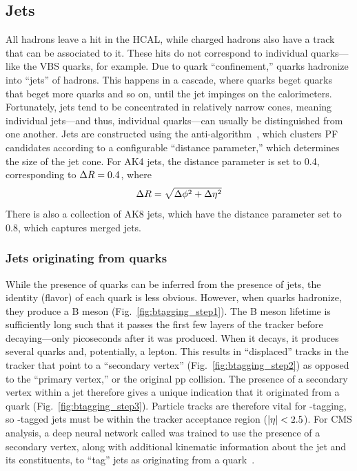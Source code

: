 \subsection{Jets}
All hadrons leave a hit in the HCAL, while charged hadrons also have a track that can be associated to it. 
These hits do not correspond to individual quarks---like the VBS quarks, for example. 
Due to quark ``confinement,'' quarks hadronize into ``jets'' of hadrons. 
This happens in a cascade, where quarks beget quarks that beget more quarks and so on, until the jet impinges on the calorimeters. 
Fortunately, jets tend to be concentrated in relatively narrow cones, meaning individual jets---and thus, individual quarks---can usually be distinguished from one another. 
Jets are constructed using the anti-\kt algorithm~\cite{Cacciari:2008gp, Cacciari:2011ma}, which clusters PF candidates according to a configurable ``distance parameter,'' which determines the size of the jet cone. %
For AK4 jets, the distance parameter is set to 0.4, corresponding to $\Delta R = 0.4$, where
\begin{equation}
    \Delta R = \sqrt{\Delta\phi^2 + \Delta\eta^2}
\end{equation}
There is also a collection of AK8 jets, which have the distance parameter set to 0.8, which captures merged jets.

\subsubsection{Jets originating from \Pb quarks}
While the presence of quarks can be inferred from the presence of jets, the identity (flavor) of each quark is less obvious. 
However, when \Pb quarks hadronize, they produce a B meson (Fig.~\ref{fig:btagging_step1}). 
The B meson lifetime is sufficiently long such that it passes the first few layers of the tracker before decaying---only picoseconds after it was produced. 
When it decays, it produces several quarks and, potentially, a lepton. 
This results in ``displaced'' tracks in the tracker that point to a ``secondary vertex'' (Fig.~\ref{fig:btagging_step2}) as opposed to the ``primary vertex,'' or the original pp collision. 
The presence of a secondary vertex within a jet therefore gives a unique indication that it originated from a \Pb quark (Fig.~\ref{fig:btagging_step3}). 
Particle tracks are therefore vital for \Pb-tagging, so \Pb-tagged jets must be within the tracker acceptance region ($\lvert \eta \rvert < 2.5$). 
For CMS analysis, a deep neural network called \DeepJet was trained to use the presence of a secondary vertex, along with additional kinematic information about the jet and its constituents, to ``tag'' jets as originating from a \Pb quark~\cite{Bols:2020bkb}. 

